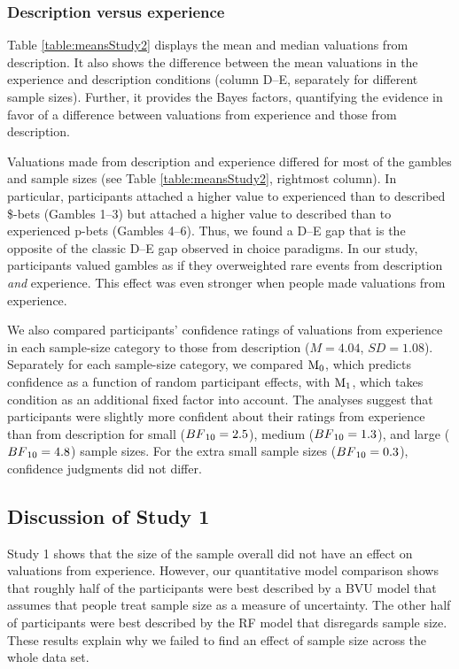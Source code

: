 \documentclass[a4paper, man, natbib, floatsintext]{apa6} %
\begin{document}
\subsubsection{Description versus experience}
Table \ref{table:meansStudy2} displays the mean and median valuations from description. It also shows the difference between the mean valuations in the experience and description conditions (column D--E, separately for different sample sizes). Further, it provides the Bayes factors, quantifying the evidence in favor of a difference between valuations from experience and those from description.


Valuations made from description and experience differed for most of the gambles and sample sizes (see Table \ref{table:meansStudy2}, rightmost column). In particular, participants attached a higher value to experienced than to described \$-bets (Gambles 1--3) but attached a higher value to described than to experienced p-bets (Gambles 4--6). Thus, we found a D--E gap that is the opposite of the classic D--E gap observed in choice paradigms. In our study, participants valued gambles as if they overweighted rare events from description \textit{and} experience. This effect was even stronger when people made valuations from experience.

We also compared participants' confidence ratings of valuations from experience in each sample-size category to those from description ($M = 4.04$, $SD = 1.08$). Separately for each sample-size category, we compared $\mathrm{M}\textsubscript{0}$, which predicts confidence as a function of random participant effects, with $\mathrm{M}\textsubscript{1}$, which takes condition as an additional fixed factor into account. The analyses suggest that participants were slightly more confident about their ratings from experience than from description for small ($BF\textsubscript{10} = 2.5$), medium ($BF\textsubscript{10} = 1.3$), and large ($BF\textsubscript{10} = 4.8$) sample sizes. For the extra small sample sizes ($BF\textsubscript{10} = 0.3$), confidence judgments did not differ. 


\subsection{Discussion of Study 1}

Study 1 shows that the size of the sample overall did not have an effect on valuations from experience. However, our quantitative model comparison shows that roughly half of the participants were best described by a BVU model that assumes that people treat sample size as a measure of uncertainty. The other half of participants were best described by the RF model that disregards sample size. These results explain why we failed to find an effect of sample size across the whole data set. 
\end{document}
